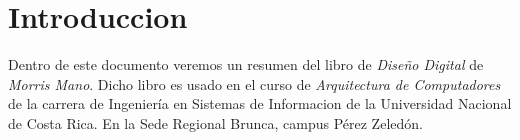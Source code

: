 \section*{Introduccion}
    Dentro de este documento veremos un resumen del libro 
    de \textit{Diseño Digital} de \textit{Morris Mano}. Dicho libro 
    es usado en el curso de \textit{Arquitectura de Computadores} 
    de la carrera de Ingeniería en Sistemas de Informacion de la Universidad
    Nacional de Costa Rica. En la Sede Regional Brunca, campus Pérez Zeledón.